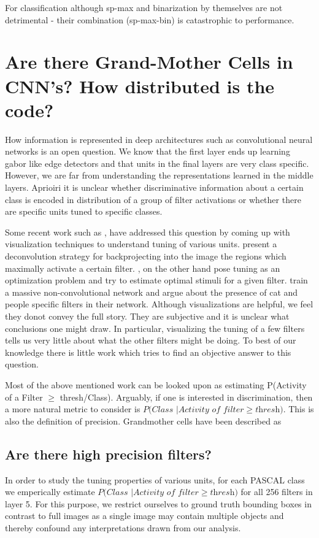\documentclass[runningheads]{llncs}
\begin{document}
For classification although sp-max and binarization by themselves are not detrimental - their combination (sp-max-bin) is catastrophic to performance.

\section{Are there Grand-Mother Cells in CNN's? How distributed is the code?}
\label{sec:grand-mother}
How information is represented in deep architectures such as convolutional neural networks is an open question. We know that the first layer ends up learning gabor like edge detectors and that units in the final layers are very class specific. However, we are far from understanding the representations learned in the middle layers. Aprioiri it is unclear whether discriminative information about a certain class is encoded in distribution of a group of filter activations or whether there are specific units tuned to specific classes.

Some recent work such as \cite{DeConv}, \cite{Simonyan} have addressed this question by coming up with visualization techniques to understand tuning of various units. \cite{DeConv} present a deconvolution strategy for backprojecting into the image the regions which maximally activate a certain filter.  \cite{Simonyan}, on the other hand pose tuning as an optimization problem and try to estimate optimal stimuli for a given filter. \cite{GoogleCat} train a massive non-convolutional network and argue about the presence of cat and people specific filters in their network. Although visualizations are helpful, we feel they donot convey the full story. They are subjective and it is unclear what conclusions one might draw. In particular, visualizing the tuning of a few filters tells us very little about what the other filters might be doing. To best of our knowledge there is little work which tries to find an objective answer to this question.

Most of the above mentioned work can be looked upon as estimating P(Activity of a Filter $\geq$ thresh/Class). Arguably, if one is interested in discrimination, then a more natural metric to consider is $\textit{P(Class } | \textit{Activity of filter} \geq \textit{thresh})$. This is also the definition of precision. Grandmother cells have been described as   


\subsection{Are there high precision filters?}
\label{sub:class-specific-unit}
In order to study the tuning properties of various units, for each PASCAL class we emperically estimate $\textit{P(Class } | \textit{Activity of filter} \geq \textit{thresh})$ for all 256 filters in layer 5. For this purpose, we restrict ourselves to ground truth bounding boxes in contrast to full images as a single image may contain multiple objects and thereby confound any interpretations drawn from our analysis. 
\end{document}
